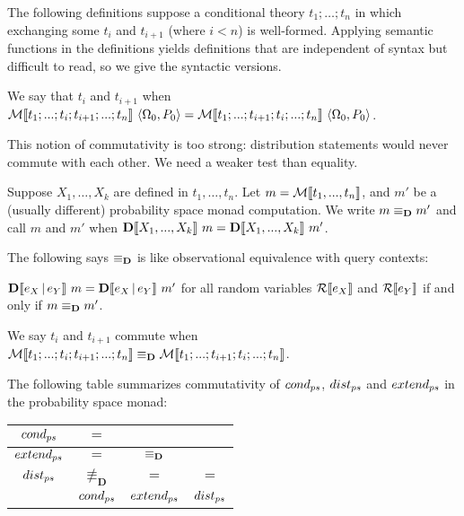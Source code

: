 The following definitions suppose a conditional theory $t_1;\dots;t_n$ in which exchanging some $t_i$ and $t_{i+1}$ (where $i < n$) is well-formed. Applying semantic functions in the definitions yields definitions that are independent of syntax but difficult to read, so we give the syntactic versions.

\begin{definition}[commutativity]
We say that $t_i$ and $t_{i+1}$  when \\ ${\mathcal{M}\!\left\llbracket{t_1;...;t_i;t_{i+1};...;t_n}\right\rrbracket}\ {\langle{\Omega_0,P_0}\rangle} = {\mathcal{M}\!\left\llbracket{t_1;...;t_{i+1};t_i;...;t_n}\right\rrbracket}\ {\langle{\Omega_0,P_0}\rangle}$.
\end{definition}

This notion of commutativity is too strong: distribution statements would never commute with each other. We need a weaker test than equality.

\begin{definition}
Suppose $X_1,\dots,X_k$ are defined in $t_1,\dots,t_n$. Let $m = \mathcal{M}\!\left\llbracket{t_1,...,t_n}\right\rrbracket$, and $m'$ be a (usually different) probability space monad computation. We write $m \equiv_\mathbf{D} m'$ and call $m$ and $m'$  when ${\mathbf{D}\!\left\llbracket{X_1,...,X_k}\right\rrbracket}\ {m} = {\mathbf{D}\!\left\llbracket{X_1,...,X_k}\right\rrbracket}\ {m'}$.
\end{definition}

The following says $\equiv_\mathbf{D}$ is like observational equivalence with query contexts:

\begin{theorem}[context]
\label{thm:context}
${\mathbf{D}\!\left\llbracket{e_X \,|\,e_Y}\right\rrbracket}\ {m} = {\mathbf{D}\!\left\llbracket{e_X \,|\,e_Y}\right\rrbracket}\ {m'}$ for all random variables $\mathcal{R}\!\left\llbracket{e_X}\right\rrbracket$ and $\mathcal{R}\!\left\llbracket{e_Y}\right\rrbracket$ if and only if $m \equiv_\mathbf{D} m'$.
\end{theorem}

\begin{definition}
We say $t_i$ and $t_{i+1}$ commute  when $\mathcal{M}\!\left\llbracket{t_1;...;t_i;t_{i+1};...;t_n}\right\rrbracket \equiv_\mathbf{D} \mathcal{M}\!\left\llbracket{t_1;...;t_{i+1};t_i;...;t_n}\right\rrbracket$.
\end{definition}

\begin{theorem}
\label{thm:commutativity}
The following table summarizes commutativity of $cond_{ps}$, $dist_{ps}$ and $extend_{ps}$ in the probability space monad:
\begin{center}
\begin{tabular}{c|c|c|c}
	$cond_{ps}$ & $=$ & & \\
	\hline
	$extend_{ps}$ & $=$ & $\equiv_\mathbf{D}$ & \\
	\hline
	$dist_{ps}$ & $\not\equiv_{\mathbf{D}}$ & $=$ & $=$\\
	\hline
	 & $cond_{ps}$ & $extend_{ps}$ & $dist_{ps}$
\end{tabular}
\end{center}
\end{theorem}


